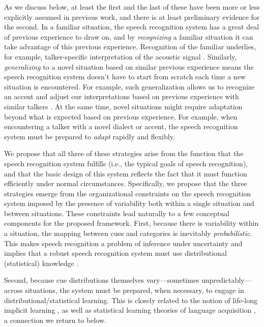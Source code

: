 \label{r1-formalize-prev-work}
As we discuss below, at least the first and the last of these have been more or less explicitly assumed in previous work, and there is at least preliminary evidence for the second.  In a familiar situation, the speech recognition system has a great deal of previous experience to draw on, and by \emph{recognizing} a familiar situation it can take advantage of this previous experience. Recognition of the familiar underlies, for example, talker-specific interpretation of the acoustic signal \autocite{Creel2008,Eisner2005,Goldinger1998,Kraljic2007,Nygaard1998}. Similarly, {\em generalizing} to a novel situation based on similar previous experience means the speech recognition system doesn't have to start from scratch each time a new situation is encountered. For example, such generalization allows us to recognize an accent and adjust our interpretations based on previous experience with similar talkers \autocite{Baese-berk2013,Bradlow2008,Sidaras2009}. At the same time, novel situations might require adaptation beyond what is expected based on previous experience. For example, when encountering a talker with a novel dialect or accent, the speech recognition system must be prepared to \emph{adapt} rapidly and flexibly.

We propose that all three of these strategies arise from the function that the speech recognition system fulfills (i.e., the typical goals of speech recognition), and that the basic design of this system reflects the fact that it must function efficiently under normal
circumstances. Specifically, we propose that the three strategies emerge from the organizational constraints on the speech recognition system imposed by the presence of variability both within a single situation and between situations.  These constraints lead naturally to a few conceptual components for the proposed framework.  First, because there is variability within a situation, the mapping between cues and categories is inevitably \emph{probabilistic}. This makes speech recognition a problem of inference under uncertainty and implies that a robust speech recognition system must use distributional (statistical) knowledge \autocite{Clayards2008,Feldman2009a,Norris2008}.

Second, because cue distributions themselves vary---sometimes unpredictably---across situations, the system must be prepared, when necessary, to engage in distributional/statistical learning.  This is closely related to the notion of life-long implicit learning \autocite{Botvinick2004,Elman1990,Chang2006}, as well as statistical learning theories of language acquisition \autocite{Feldman2013a,McMurray2009,Vallabha2007}, a connection we return to below.

